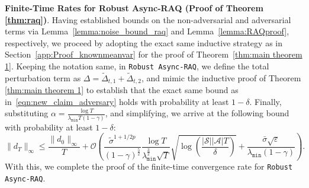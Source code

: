 \documentclass{article}
\newcommand{\mc}{\mathcal}
\begin{document}
\textbf{Finite-Time Rates for Robust Async-RAQ (Proof of Theorem \ref{thm:raq})}. Having established bounds on the non-adversarial and adversarial terms via Lemma~\ref{lemma:noise_bound_raq} and Lemma~\ref{lemma:RAQproof}, respectively, we proceed by adopting the exact same inductive strategy as in Section~\ref{app:Proof_knownmeanvar} for the proof of Theorem~\ref{thm:main theorem 1}. Keeping the notation same, in \texttt{Robust Async-RAQ}, we define the total perturbation term as \(\Delta = \tilde{\Delta}_{t,1} + \tilde{\Delta}_{t,2}\), and mimic the inductive proof of Theorem \ref{thm:main theorem 1} to establish that the exact same bound as in~\eqref{eqn:new_claim_adversary} holds with probability at least $1-\delta$. Finally, substituting \( \alpha = \frac{\log T}{\lambda_{\texttt{min}}T(1-\gamma)} \), and simplifying, we arrive at the following bound with probability at least $1-\delta$:
\begin{equation}
    \lVert d_T \rVert_{\infty} \leq \frac{\lVert d_0 \rVert_{\infty}}{T} + \mc{O}\left( \frac{\tilde{\sigma}^{1+1/2p}}{(1-\gamma)^{\frac{5}{2}}}  \frac{\log T}{\lambda_{\texttt{min}}^{\frac{3}{2}}\sqrt{T}} \sqrt{ \log \left(\frac{ |\mathcal{S}||\mathcal{A}| T}{\delta}\right)} +  \frac{\bar{\sigma}\sqrt{\varepsilon}}{\lambda_{\texttt{min}}(1-\gamma)}\right).
\end{equation}
With this, we complete the proof of the finite-time convergence rate for \texttt{Robust Async-RAQ}.

\newpage
\end{document}
